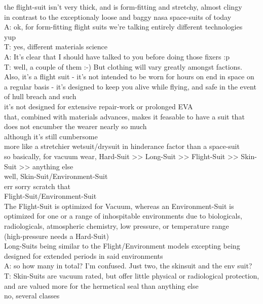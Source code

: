 the flight-suit isn't very thick, and is form-fitting and stretchy, almost clingy\\
in contrast to the exceptionaly loose and baggy nasa space-suits of today\\
A: ok, for form-fitting flight suits we're talking entirely different technologies\\
yup\\
T: yes, different materials science\\
A: It's clear that I should have talked to you before doing those fixers :p\\
T: well, a couple of them :-) But clothing will vary greatly amongst factions. Also, it's a flight suit - it's not intended to be worn for hours on end in space on a regular basis - it's designed to keep you alive while flying, and safe in the event of hull breach and such\\
it's not designed for extensive repair-work or prolonged EVA\\
that, combined with materials advances, makes it feasable to have a suit that does not encumber the wearer nearly so much\\
although it's still cumbersome\\
more like a stretchier wetsuit/drysuit in hinderance factor than a space-suit\\
so basically, for vacuum wear, Hard-Suit >> Long-Suit >> Flight-Suit >> Skin-Suit >> anything else\\
well, Skin-Suit/Environment-Suit\\
err sorry scratch that\\
Flight-Suit/Environment-Suit\\
The Flight-Suit is optimized for Vacuum, whereas an Environment-Suit is optimized for one or a range of inhospitable environments due to biologicals, radiologicals, atmospheric chemistry, low pressure, or temperature range\\
(high-pressure needs a Hard-Suit)\\
Long-Suits being similar to the Flight/Environment models excepting being designed for extended periods in said environments\\
A: so how many in total? I'm confused. Just two, the skinsuit and the env suit?\\
T: Skin-Suits are vacuum rated, but offer little physical or radiological protection, and are valued more for the hermetical seal than anything else\\
no, several classes\\
